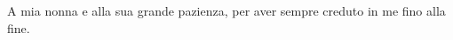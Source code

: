   \newpage 
  
  {%
   \thispagestyle{empty}%
   \itshape             %
   \raggedleft          %
  }
  \begin{flushright}
  
    A mia nonna e alla sua grande pazienza, 
    per aver sempre creduto in me fino alla fine.
  
  
  \end{flushright}
  {\par %
   \clearpage           %
  }

\newpage



